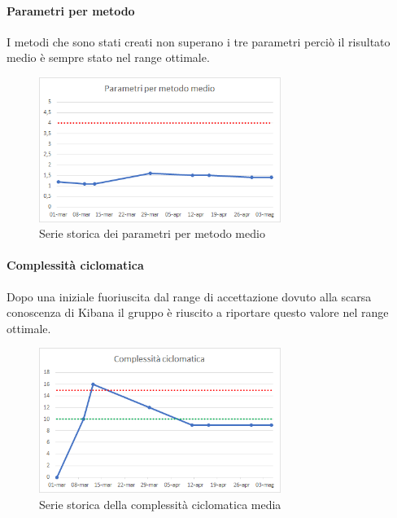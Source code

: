     \paragraph{Parametri per metodo} \Spazio
    I metodi che sono stati creati non superano i tre parametri perciò il risultato medio è sempre stato nel range ottimale.
    \begin{figure}[H]
    	\centering 
    	\includegraphics[width=0.7\textwidth]{Images/parametri.png}
    	\caption{Serie storica dei parametri per metodo medio}
    	\label{parametri} 
    \end{figure}
    \paragraph{Complessità ciclomatica} \Spazio
    Dopo una iniziale fuoriuscita dal range di accettazione dovuto alla scarsa conoscenza di Kibana il gruppo è riuscito a riportare questo valore nel range ottimale.
    \begin{figure}[H]
    	\centering 
    	\includegraphics[width=0.7\textwidth]{Images/ciclo.png}
    	\caption{Serie storica della complessità ciclomatica media}
    	\label{ciclo} 
    \end{figure}
